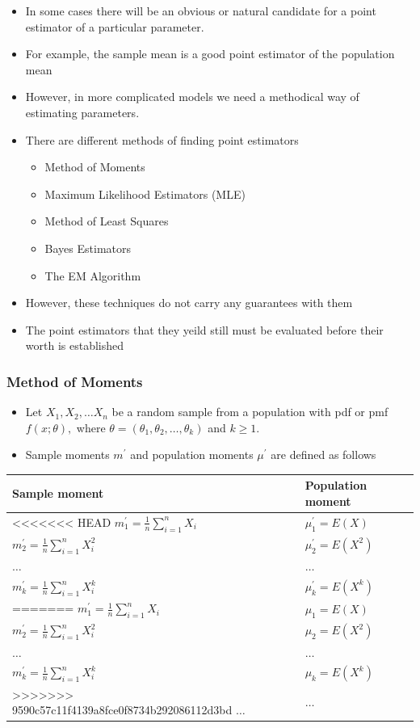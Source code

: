 \documentclass[]{book}
\providecommand{\tightlist}{%
  \setlength{\itemsep}{0pt}\setlength{\parskip}{0pt}}
\begin{document}
\begin{itemize}
\tightlist
\item
  In some cases there will be an obvious or natural candidate for a point estimator of a particular parameter.
\item
  For example, the sample mean is a good point estimator of the population mean
\item
  However, in more complicated models we need a methodical way of estimating parameters.
\item
  There are different methods of finding point estimators

  \begin{itemize}
  \tightlist
  \item
    Method of Moments
  \item
    Maximum Likelihood Estimators (MLE)
  \item
    Method of Least Squares 
  \item
    Bayes Estimators
  \item
    The EM Algorithm
  \end{itemize}
\item
  However, these techniques do not carry any guarantees with them
\item
  The point estimators that they yeild still must be evaluated before their worth is established
\end{itemize}

\hypertarget{method-of-moments}{%
\subsubsection{Method of Moments}\label{method-of-moments}}

\begin{itemize}
\tightlist
\item
  Let \(X_1, X_2, \dots X_n\) be a random sample from a population with pdf or pmf \(f(x; \theta),\) where \(\theta = (\theta_1, \theta_2, \dots, \theta_k)\) and \(k\geq 1\).
\item
  Sample moments \(m^\prime\) and population moments \(\mu^\prime\) are defined as follows
\end{itemize}

\begin{longtable}[]{@{}ll@{}}
\toprule
Sample moment & Population moment\tabularnewline
\midrule
\endhead
<<<<<<< HEAD
\(m_1^\prime= \frac{1}{n}\sum_{i=1}^nX_i\) & \(\mu_1^\prime=E(X)\)\tabularnewline
\(m_2^\prime= \frac{1}{n}\sum_{i=1}^nX_i^2\) & \(\mu_2^\prime=E(X^2)\)\tabularnewline
\(\dots\) & \(\dots\)\tabularnewline
\(m_k^\prime= \frac{1}{n}\sum_{i=1}^nX_i^k\) & \(\mu_k^\prime=E(X^k)\)\tabularnewline
=======
\(m_1^\prime= \frac{1}{n}\sum_{i=1}^nX_i\) & \(\mu_1=E(X)\)\tabularnewline
\(m_2^\prime= \frac{1}{n}\sum_{i=1}^nX_i^2\) & \(\mu_2=E(X^2)\)\tabularnewline
\(\dots\) & \(\dots\)\tabularnewline
\(m_k^\prime= \frac{1}{n}\sum_{i=1}^nX_i^k\) & \(\mu_k=E(X^k)\)\tabularnewline
>>>>>>> 9590c57c11f4139a8fce0f8734b292086112d3bd
\(\dots\) & \(\dots\)\tabularnewline
\bottomrule
\end{longtable}
\end{document}
